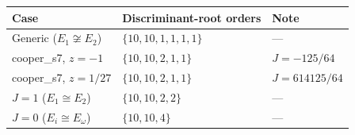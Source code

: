 \begin{tabular}{lll}
\toprule
Case & Discriminant-root orders & Note \\
\midrule
Generic ($E_1\not\cong E_2$) & $\{10,10,1,1,1,1\}$ & --- \\
cooper\_s7, $z=-1$ & $\{10,10,2,1,1\}$ & $J=-125/64$ \\
cooper\_s7, $z=1/27$ & $\{10,10,2,1,1\}$ & $J=614125/64$ \\
$J=1$ ($E_1\cong E_2$) & $\{10,10,2,2\}$ & --- \\
$J=0$ ($E_i\cong E_\omega$) & $\{10,10,4\}$ & --- \\
\bottomrule
\end{tabular}
